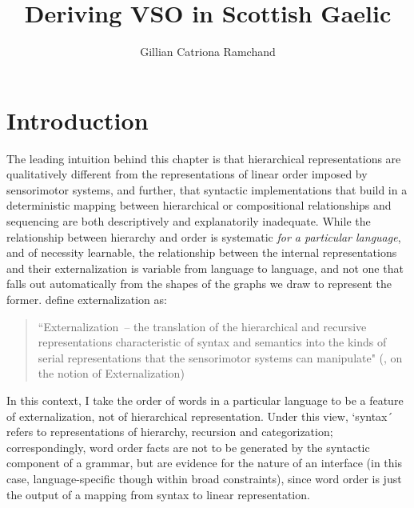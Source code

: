 \documentclass[output=paper,colorlinks,citecolor=brown]{langscibook}
\author{Gillian Catriona Ramchand\affiliation{UiT The Arctic University of Norway\\Oxford University}}
\title{Deriving VSO in Scottish Gaelic}
\begin{document}
\AffiliationsWithoutIndexing
\maketitle
{}


\section{Introduction}\label{sec:ramchand:1}
The leading intuition behind this chapter is that hierarchical representations are qualitatively different from the representations of linear order imposed by sensorimotor systems, and further, that syntactic implementations that build in a deterministic mapping between  hierarchical or compositional relationships and sequencing are both descriptively and explanatorily inadequate. While the relationship between hierarchy and order is systematic \textit{for a particular language}, and of necessity learnable, the relationship between the internal representations and their externalization is variable from language to language, and  not one that falls out automatically from the shapes of the graphs we draw to represent the former.  \citet{berwickchomsky11} define externalization as:


\begin{quotation}
“Externalization~-- the translation of the hierarchical and recursive representations characteristic of syntax and semantics into the kinds of serial representations that the sensorimotor systems can manipulate"  (\citealt{bennettetal16},  on the \citealt{berwickchomsky11} notion of Externalization) 
\end{quotation}

In this context, I take the order of words in a particular language to be a feature of externalization, not of hierarchical representation. Under this view, `syntax´  refers  to representations of hierarchy, recursion and categorization; correspondingly, word order facts are not to be generated by the syntactic component of a grammar, but are evidence for the nature of an interface (in this case, language-specific though within broad constraints), since word order is just the output of a mapping from syntax to linear representation. 
\end{document}
